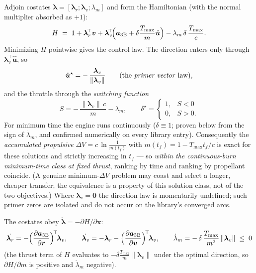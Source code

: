 \documentclass[11pt]{article}
\newcommand{\Rv}{\bm{r}}
\newcommand{\Vv}{\bm{v}}
\newcommand{\lr}{\bm{\lambda}_r}
\newcommand{\lv}{\bm{\lambda}_v}
\newcommand{\uh}{\hat{\bm{u}}}
\begin{document}
Adjoin costates $\bm\lambda = [\lr;\lv;\lambda_m]$ and form the
Hamiltonian (with the normal multiplier absorbed as $+1$):
\begin{equation}
H \;=\; 1 + \lr^{\!\top}\Vv
      + \lv^{\!\top}\!\Big(\bm a_{\rm 3B} + \delta\frac{T_{\max}}{m}\uh\Big)
      - \lambda_m\,\delta\,\frac{T_{\max}}{c}.
\label{eq:H}
\end{equation}
Minimizing $H$ pointwise gives the control law. The direction enters only
through $\lv^{\!\top}\uh$, so
\begin{equation}
\uh^\star = -\,\frac{\lv}{\lVert\lv\rVert}
\qquad\text{(the \emph{primer vector} law)},
\end{equation}
and the throttle through the \emph{switching function}
\begin{equation}
S = -\,\frac{\lVert\lv\rVert\,c}{m} - \lambda_m,
\qquad
\delta^\star = \begin{cases} 1, & S<0\\ 0, & S>0 . \end{cases}
\end{equation}
For minimum time the engine runs continuously ($\delta\equiv1$; proven
below from the sign of $\dot\lambda_m$, and confirmed numerically on every
library entry). Consequently the \emph{accumulated propulsive}
$\Delta V = c\,\ln\!\frac{1}{m(t_f)}$ with $m(t_f) = 1 - T_{\max}t_f/c$ is
exact for these solutions and strictly increasing in $t_f$ --- so
\emph{within the continuous-burn minimum-time class at fixed thrust},
ranking by time and ranking by propellant coincide. (A genuine
minimum-$\Delta V$ problem may coast and select a longer, cheaper transfer;
the equivalence is a property of this solution class, not of the two
objectives.) Where $\lv = \bm 0$ the direction law is momentarily
undefined; such primer zeros are isolated and do not occur on the library's
converged arcs.

The costates obey $\dot{\bm\lambda} = -\partial H/\partial \bm x$:
\begin{equation}
\dot{\lr} = -\Big(\frac{\partial \bm a_{\rm 3B}}{\partial \Rv}\Big)^{\!\top}\!\lv,
\qquad
\dot{\lv} = -\lr
            -\Big(\frac{\partial \bm a_{\rm 3B}}{\partial \Vv}\Big)^{\!\top}\!\lv,
\qquad
\dot\lambda_m = -\,\delta\,\frac{T_{\max}}{m^2}\,\lVert\lv\rVert
\;\leq\; 0
\end{equation}
(the thrust term of $H$ evaluates to $-\delta\frac{T_{\max}}{m}\lVert\lv\rVert$
under the optimal direction, so $\partial H/\partial m$ is positive and
$\dot\lambda_m$ negative).
\end{document}
